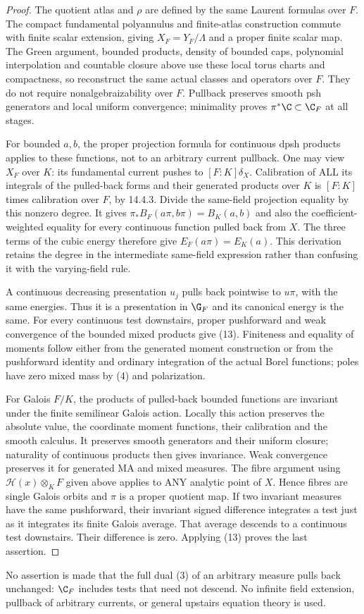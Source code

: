 \begin{proof}
The quotient atlas and $\rho$ are defined by the same Laurent formulas over
$F$. The compact fundamental polyannulus and finite-atlas construction
commute with finite scalar extension, giving $X_F=Y_F/\Lambda$ and a proper
finite scalar map. The Green argument, bounded products, density of bounded
caps, polynomial interpolation and countable closure above use these local
torus charts and compactness, so reconstruct the same actual classes and
operators over $F$. They do not require nonalgebraizability over $F$.
Pullback preserves smooth psh generators and local uniform convergence;
minimality proves $\pi^*\C\subset\C_F$ at all stages.

For bounded $a,b$, the proper projection formula for continuous dpsh products
applies to these functions, not to an arbitrary current pullback.
One may view $X_F$ over $K$: its fundamental current pushes to
$[F:K]\delta_X$. Calibration of ALL its integrals of the pulled-back forms
and their generated products over $K$ is $[F:K]$ times calibration over $F$,
by 14.4.3. Divide the same-field projection equality by this nonzero degree.
It gives
$\pi_*B_F(a\pi,b\pi)=B_K(a,b)$ and also the coefficient-weighted equality
for every continuous function pulled back from $X$.
The three terms of the cubic energy therefore give
$E_F(a\pi)=E_K(a)$. This derivation retains the degree in the intermediate
same-field expression rather than confusing it with the varying-field rule.

A continuous decreasing presentation $u_j$ pulls back pointwise to $u\pi$,
with the same energies. Thus it is a presentation in $\G_F$ and its canonical
energy is the same. For every continuous test downstairs, proper pushforward
and weak convergence of the bounded mixed products give (13).
Finiteness and equality of moments follow either from the generated moment
construction or from the pushforward identity and ordinary integration of
the actual Borel functions; poles have zero mixed mass by (4) and polarization.

For Galois $F/K$, the products of pulled-back bounded functions are invariant
under the finite semilinear Galois action. Locally this action preserves the
absolute value, the coordinate moment functions, their calibration and the
smooth calculus. It preserves smooth generators and their uniform closure;
naturality of continuous products then gives invariance. Weak convergence
preserves it for generated MA and mixed measures.
The fibre argument using $\mathcal H(x)\otimes_KF$ given above applies to
ANY analytic point of $X$. Hence fibres are single Galois orbits and $\pi$
is a proper quotient map. If two invariant measures have the same pushforward,
their invariant signed difference integrates a test just as it integrates its
finite Galois average. That average descends to a continuous test downstairs.
Their difference is zero. Applying (13) proves the last assertion.
\end{proof}
No assertion is made that the full dual (3) of an arbitrary measure pulls
back unchanged: $\C_F$ includes tests that need not descend.
No infinite field extension, pullback of arbitrary currents, or general
upstairs equation theory is used.

